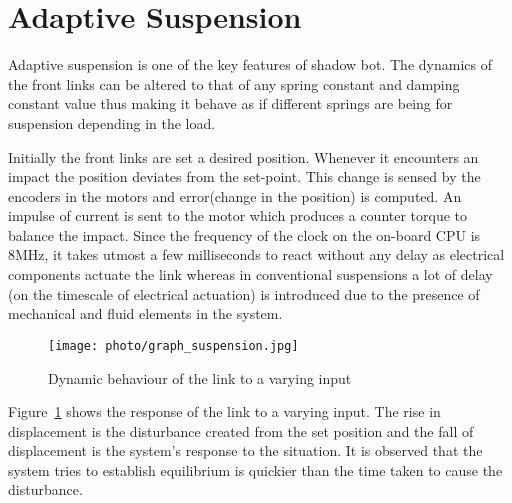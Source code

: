 \section{Adaptive Suspension}
Adaptive suspension is one of the key features of shadow bot. The dynamics of the front links can be altered to that of any spring constant and damping constant value thus making it behave as if different springs are being for suspension depending in the load.

Initially the front links are set a desired position. Whenever it encounters an impact the position deviates from the set-point. This change is sensed by the encoders in the motors and error(change in the position) is computed. An impulse of current is sent to the motor which produces a counter torque to balance the impact. Since the frequency of the clock on the on-board CPU is 8MHz, it takes utmost a few milliseconds to react without any delay as electrical components actuate the link whereas in conventional suspensions a lot of delay (on the timescale of electrical actuation) is introduced due to the presence of mechanical and fluid elements in the system.

\begin{figure}[h]
  \begin{center}
  \texttt{[image: photo/graph\_suspension.jpg]}
  \caption{Dynamic behaviour of the link to a varying input}\label{suspesnion_graph}
  \end{center}
\end{figure}

Figure~\ref{suspesnion_graph} shows the response of the link to a varying input. The rise in displacement is the disturbance created from the set position and the fall of displacement is the system's response to the situation. It is observed that the system tries to establish equilibrium is quickier than the time taken to cause the disturbance.
